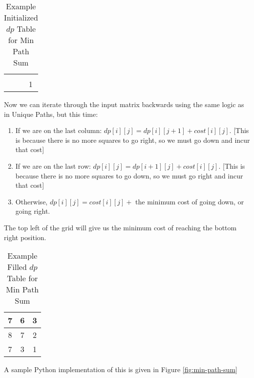 \begin{table}[H]
    \centering
    \begin{tabular}{|c|c|c|}
        \hline
        \phantom{0} & \phantom{0} &  \\
        \hline
         &  &  \\
        \hline
         &  & 1 \\
        \hline
    \end{tabular}
    \caption{Example Initialized $dp$ Table for Min Path Sum}
\end{table}
Now we can iterate through the input matrix backwards using the same logic as in Unique Paths, but this time:


\begin{enumerate}
    \item If we are on the last column: $dp[i][j] = dp[i][j+1] + cost[i][j]$.
    [This is because there is no more squares to go right, so we must go down and incur that cost]

    \item If we are on the last row: $dp[i][j] = dp[i+1][j] + cost[i][j]$.
    [This is because there is no more squares to go down, so we must go right and incur that cost]

    \item Otherwise, $dp[i][j] = cost[i][j] +$ the minimum cost of going down, or going right.

\end{enumerate}

The top left of the grid will give us the minimum cost of reaching the bottom right position.

\begin{table}[H]
    \centering
    \begin{tabular}{|c|c|c|}
        \hline
        7 & 6 & 3 \\
        \hline
        8 & 7 & 2 \\
        \hline
        7 & 3 & 1 \\
        \hline
    \end{tabular}
    \caption{Example Filled $dp$ Table for Min Path Sum}
\end{table}

A sample Python implementation of this is given in Figure \ref{fig:min-path-sum}

